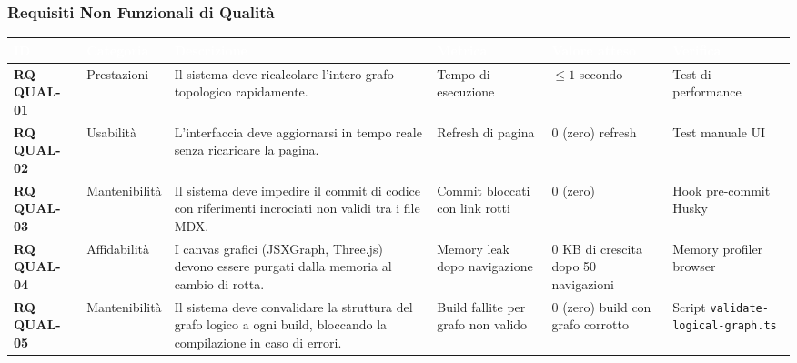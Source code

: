 \documentclass[12pt,a4paper]{article}
\begin{document}
\subsubsection{Requisiti Non Funzionali di Qualità}
\begin{table}[H]
    \centering
    \footnotesize
    \begin{tabularx}{\textwidth}{|p{2.2cm}|p{1.8cm}|X|p{1.8cm}|p{2.2cm}|p{2cm}|}
        \hline
        \rowcolor{PrimaryBlue} \textcolor{white}{\textbf{ID}} & \textcolor{white}{\textbf{Categoria}} & \textcolor{white}{\textbf{Descrizione}} & \textcolor{white}{\textbf{Metrica}} & \textcolor{white}{\textbf{Valore atteso}} & \textcolor{white}{\textbf{Verifica}} \\
        \hline
        \textbf{RQ QUAL-01} & Prestazioni & Il sistema deve ricalcolare l'intero grafo topologico rapidamente. & Tempo di esecuzione & $\le 1$ secondo & Test di performance \\
        \hline
        \rowcolor{CodeBg} \textbf{RQ QUAL-02} & Usabilità & L'interfaccia deve aggiornarsi in tempo reale senza ricaricare la pagina. & Refresh di pagina & $0$ (zero) refresh & Test manuale UI \\
        \hline
        \textbf{RQ QUAL-03} & Mantenibilità & Il sistema deve impedire il commit di codice con riferimenti incrociati non validi tra i file MDX. & Commit bloccati con link rotti & $0$ (zero) & Hook pre-commit Husky \\
        \hline
        \rowcolor{CodeBg} \textbf{RQ QUAL-04} & Affidabilità & I canvas grafici (JSXGraph, Three.js) devono essere purgati dalla memoria al cambio di rotta. & Memory leak dopo navigazione & $0$ KB di crescita dopo 50 navigazioni & Memory profiler browser \\
        \hline
        \textbf{RQ QUAL-05} & Mantenibilità & Il sistema deve convalidare la struttura del grafo logico a ogni build, bloccando la compilazione in caso di errori. & Build fallite per grafo non valido & $0$ (zero) build con grafo corrotto & Script \texttt{validate-logical-graph.ts} \\
        \hline
    \end{tabularx}
\end{table}
\end{document}
